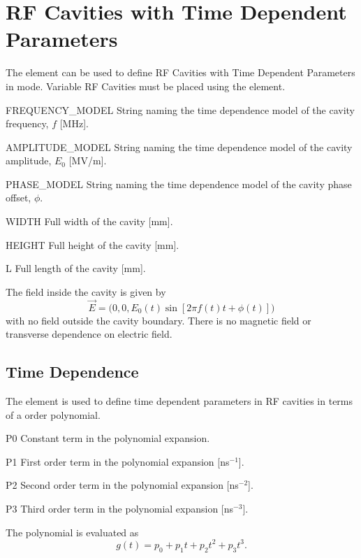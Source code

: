 \clearpage
\section{RF Cavities with Time Dependent Parameters}
\label{sec:variable-rf-cavity-cycl}
The  element can be used to define RF Cavities with
Time Dependent Parameters in \opalcycl mode. Variable RF Cavities must be
placed using the  element.
\begin{kdescription}
\item[FREQUENCY\_MODEL]
  String naming the time dependence model of the cavity frequency, $f$ [\si{\mega\hertz}].
\item[AMPLITUDE\_MODEL]
  String naming the time dependence model of the cavity amplitude, $E_0$ [\si{\mega\volt/\meter}].
\item[PHASE\_MODEL]
  String naming the time dependence model of the cavity phase offset, $\phi$.
\item[WIDTH]
  Full width of the cavity [\si{\milli\meter}].
  \item[HEIGHT]
  Full height of the cavity [\si{\milli\meter}].
  \item[L]
  Full length of the cavity [\si{\milli\meter}].
\end{kdescription}
The field inside the cavity is given by
\begin{equation}
\vec{E} = \big(0, 0, E_0(t)\sin[2\pi f(t) t+\phi(t)]\big)
\end{equation}
with no field outside the cavity boundary. There is no magnetic field or
transverse dependence on electric field.

\subsection{Time Dependence}
\label{sec:polynomial-time-dependence}
The  element is used to define time dependent
parameters in RF cavities in terms of a  order polynomial.
\begin{kdescription}
\item[P0]
  Constant term in the polynomial expansion.
\item[P1]
  First order term in the polynomial expansion [ns$^{-1}$].
\item[P2]
  Second order term in the polynomial expansion [ns$^{-2}$].
  \item[P3]
  Third order term in the polynomial expansion [ns$^{-3}$].
\end{kdescription}
The polynomial is evaluated as
\begin{equation}
g(t) = p_0 + p_1 t + p_2 t^2 + p_3 t^3 %
.
\end{equation}

